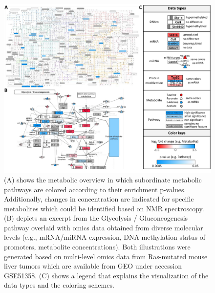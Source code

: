 \documentclass[final,5p,times,twocolumn]{elsarticle}
\newcommand\red[1]{{\color{red}#1}}
\begin{document}
\begin{figure}[t]
\center
\includegraphics[width=1.0\textwidth]{InCroMAP_examples.pdf}
\caption{\red{(A) shows the metabolic overview in which subordinate metabolic pathways are colored according to their enrichment p-values. Additionally, changes in concentration are indicated for specific metabolites which could be identified based on NMR spectroscopy. (B) depicts an excerpt from the Glycolysis / Gluconeogenesis pathway overlaid with omics data obtained from diverse molecular levels (e.g., mRNA/miRNA expression, DNA methylation status of promoters, metabolite concentrations). Both illustrations were generated based on multi-level omics data from Ras-mutated mouse liver tumors which are available from GEO under accession GSE51358.} (C) shows a legend that explains the visualization of the data types and the coloring schemes.}
\label{fig:incromap-examples}
\end{figure}
\end{document}
